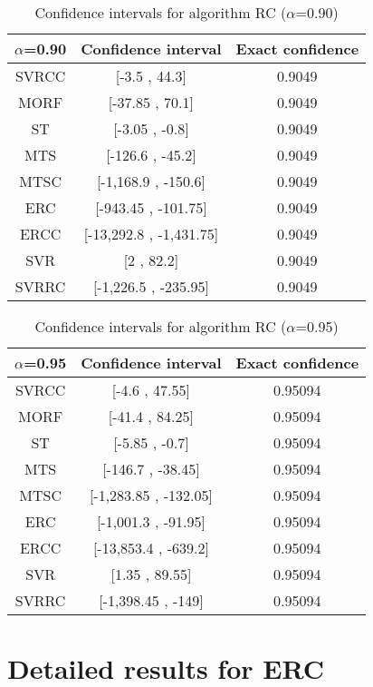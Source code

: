 \documentclass[a4paper,10pt]{article}
\begin{document}
\begin{table}[!htp]
\centering\small
\begin{tabular}{
|c|c|c|}
\hline
 $\alpha$=0.90 & Confidence interval & Exact confidence \\ \hline 
SVRCC & [-3.5 , 44.3] & 0.9049\\ \hline 
MORF & [-37.85 , 70.1] & 0.9049\\ \hline 
ST & [-3.05 , -0.8] & 0.9049\\ \hline 
MTS & [-126.6 , -45.2] & 0.9049\\ \hline 
MTSC & [-1,168.9 , -150.6] & 0.9049\\ \hline 
ERC & [-943.45 , -101.75] & 0.9049\\ \hline 
ERCC & [-13,292.8 , -1,431.75] & 0.9049\\ \hline 
SVR & [2 , 82.2] & 0.9049\\ \hline 
SVRRC & [-1,226.5 , -235.95] & 0.9049\\ \hline 

\end{tabular}
\caption{Confidence intervals for algorithm RC ($\alpha$=0.90)}
\end{table}
\begin{table}[!htp]
\centering\small
\begin{tabular}{
|c|c|c|}
\hline
 $\alpha$=0.95 & Confidence interval & Exact confidence \\ \hline 
SVRCC & [-4.6 , 47.55] & 0.95094\\ \hline 
MORF & [-41.4 , 84.25] & 0.95094\\ \hline 
ST & [-5.85 , -0.7] & 0.95094\\ \hline 
MTS & [-146.7 , -38.45] & 0.95094\\ \hline 
MTSC & [-1,283.85 , -132.05] & 0.95094\\ \hline 
ERC & [-1,001.3 , -91.95] & 0.95094\\ \hline 
ERCC & [-13,853.4 , -639.2] & 0.95094\\ \hline 
SVR & [1.35 , 89.55] & 0.95094\\ \hline 
SVRRC & [-1,398.45 , -149] & 0.95094\\ \hline 

\end{tabular}
\caption{Confidence intervals for algorithm RC ($\alpha$=0.95)}
\end{table}

 \clearpage 


\section{Detailed results for ERC}
\end{document}
